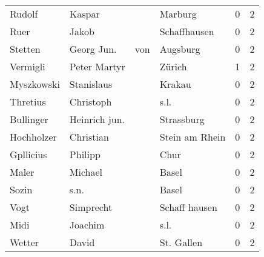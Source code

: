 \documentclass[10pt,a4paper,landscape]{article}
\begin{document}
\begin{longtable}{llllrr}
                   Rudolf &                             Kaspar &             &                                     Marburg &          0 &         2 \\
                     Ruer &                              Jakob &             &                                Schaffhausen &          0 &         2 \\
                  Stetten &                        Georg  Jun. &         von &                                    Augsburg &          0 &         2 \\
                 Vermigli &                       Peter Martyr &             &                                      Zürich &          1 &         2 \\
               Myszkowski &                         Stanislaus &             &                                      Krakau &          0 &         2 \\
                 Thretius &                          Christoph &             &                                        s.l. &          0 &         2 \\
                Bullinger &                      Heinrich jun. &             &                                  Strassburg &          0 &         2 \\
               Hochholzer &                          Christian &             &                              Stein am Rhein &          0 &         2 \\
                Gpllicius &                            Philipp &             &                                        Chur &          0 &         2 \\
                    Maler &                            Michael &             &                                       Basel &          0 &         2 \\
                    Sozin &                               s.n. &             &                                       Basel &          0 &         2 \\
                     Vogt &                          Simprecht &             &                               Schaff hausen &          0 &         2 \\
                     Midi &                            Joachim &             &                                        s.l. &          0 &         2 \\
                   Wetter &                              David &             &                                  St. Gallen &          0 &         2 \\

\end{longtable}
\end{document}
